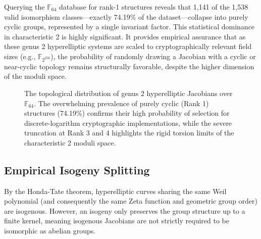 \documentclass[letterpaper, 11pt]{article}
\begin{document}
Querying the $\mathbb{F}_{64}$ database for rank-1 structures reveals that 1,141 of the 1,538 valid isomorphism classes---exactly 74.19\% of the dataset---collapse into purely cyclic groups, represented by a single invariant factor. This statistical dominance in characteristic 2 is highly significant. It provides empirical assurance that as these genus 2 hyperelliptic systems are scaled to cryptographically relevant field sizes (e.g., $\mathbb{F}_{2^{256}}$), the probability of randomly drawing a Jacobian with a cyclic or near-cyclic topology remains structurally favorable, despite the higher dimension of the moduli space.

\begin{figure}[htpb]
    \centering
    \caption{The topological distribution of genus 2 hyperelliptic Jacobians over $\mathbb{F}_{64}$. The overwhelming prevalence of purely cyclic (Rank 1) structures (74.19\%) confirms their high probability of selection for discrete-logarithm cryptographic implementations, while the severe truncation at Rank 3 and 4 highlights the rigid torsion limits of the characteristic 2 moduli space.}
    \label{fig:rank_distribution}
\end{figure}

\subsection{Empirical Isogeny Splitting}
By the Honda-Tate theorem, hyperelliptic curves sharing the same Weil polynomial (and consequently the same Zeta function and geometric group order) are isogenous. However, an isogeny only preserves the group structure up to a finite kernel, meaning isogenous Jacobians are not strictly required to be isomorphic as abelian groups. 
\end{document}
